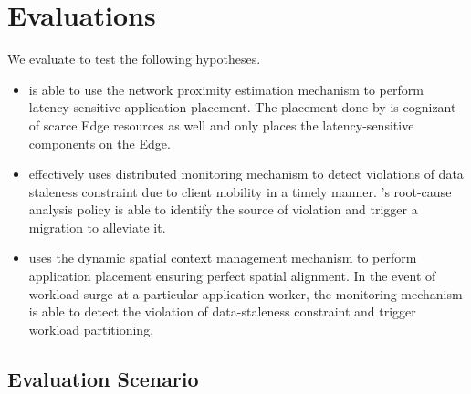 \section{Evaluations}
\label{sec:oneedge_evals}
We evaluate \oneedge{} to test the following hypotheses.
\begin{itemize}
\item \oneedge{} is able to use the network proximity estimation mechanism to perform latency-sensitive application placement. The placement done by \oneedge{} is cognizant of scarce Edge resources as well and only places the latency-sensitive components on the Edge.
\item \oneedge{} effectively uses distributed monitoring mechanism to detect violations of data staleness constraint due to client mobility in a timely manner. \oneedge{}'s root-cause analysis policy is able to identify the source of violation and trigger a migration to alleviate it.
\item \oneedge{} uses the dynamic spatial context management mechanism to perform application placement ensuring perfect spatial alignment. In the event of workload surge at a particular application worker, the monitoring mechanism is able to detect the violation of data-staleness constraint and trigger workload partitioning. 
\end{itemize}

\subsection{Evaluation Scenario}

